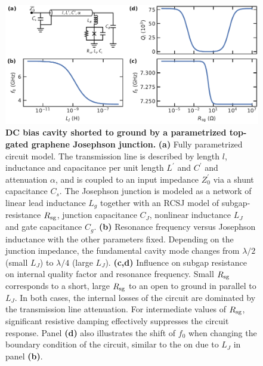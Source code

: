 \begin{figure}
	\centering
	\includegraphics[width=\linewidth]{chapter-introduction/figs/model_DC_bias_cavity_params_RCSJ.pdf}
	\caption{
		\textbf{DC bias cavity shorted to ground by a parametrized top-gated graphene Josephson junction.}
		\textbf{(a)} Fully parametrized circuit model.
		The transmission line is described by length $l$, inductance and capacitance per unit length $L^\prime$ and $C^\prime$ and attenuation $\alpha$, and is coupled to an input impedance $Z_0^\prime$ via a shunt capacitance $C_s$.
		The Josephson junction is modeled as a network of linear lead inductance $L_g$ together with an RCSJ model of subgap-resistance $R_{\rm sg}$, junction capacitance $C_J$, nonlinear inductance $L_J$ and gate capacitance $C_g$.
		\textbf{(b)} Resonance frequency versus Josephson inductance with the other parameters fixed.
		Depending on the junction impedance, the fundamental cavity mode changes from $\lambda/2$ (small $L_J$) to $\lambda/4$ (large $L_J$).
		\textbf{(c,d)} Influence on subgap resistance on internal quality factor and resonance frequency.
		Small $R_{\rm sg}$ corresponds to a short, large $R_{\rm sg}$ to an open to ground in parallel to $L_J$.
		In both cases, the internal losses of the circuit are dominated by the transmission line attenuation.
		For intermediate values of $R_{\rm sg}$, significant resistive damping effectively suppresses the circuit response.
		Panel \textbf{(d)} also illustrates the shift of $f_0$ when changing the boundary condition of the circuit, similar to the on due to $L_J$ in panel \textbf{(b)}.
	}
	\label{fig:TLmodel}
\end{figure}


